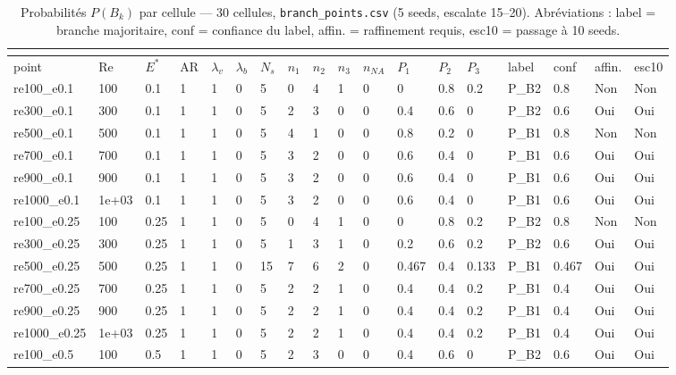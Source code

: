 \documentclass[11pt,a4paper]{article}
\begin{document}
\begin{landscape}
\begingroup\tiny
    \setlength{\tabcolsep}{1.2pt}
    \begin{longtable}{*{18}{l}}
    \caption{Probabilités $P(B_k)$ par cellule --- 30 cellules, \texttt{branch\_points.csv} (5 seeds, escalate 15--20). Abréviations : label = branche majoritaire, conf = confiance du label, affin. = raffinement requis, esc10 = passage à 10 seeds.}\\
    \label{tab:p1_points}\\
    \toprule
    point & Re & $E^*$ & AR & $\lambda_v$ & $\lambda_b$ & $N_s$ & $n_1$ & $n_2$ & $n_3$ & $n_{NA}$ & $P_1$ & $P_2$ & $P_3$ & label & conf & affin. & esc10 \\
    \midrule
    \endhead
    \bottomrule
    \endlastfoot
    re100\_e0.1 & 100 & 0.1 & 1 & 1 & 0 & 5 & 0 & 4 & 1 & 0 & 0 & 0.8 & 0.2 & P\_B2 & 0.8 & Non & Non \\
    re300\_e0.1 & 300 & 0.1 & 1 & 1 & 0 & 5 & 2 & 3 & 0 & 0 & 0.4 & 0.6 & 0 & P\_B2 & 0.6 & Oui & Oui \\
    re500\_e0.1 & 500 & 0.1 & 1 & 1 & 0 & 5 & 4 & 1 & 0 & 0 & 0.8 & 0.2 & 0 & P\_B1 & 0.8 & Non & Non \\
    re700\_e0.1 & 700 & 0.1 & 1 & 1 & 0 & 5 & 3 & 2 & 0 & 0 & 0.6 & 0.4 & 0 & P\_B1 & 0.6 & Oui & Oui \\
    re900\_e0.1 & 900 & 0.1 & 1 & 1 & 0 & 5 & 3 & 2 & 0 & 0 & 0.6 & 0.4 & 0 & P\_B1 & 0.6 & Oui & Oui \\
    re1000\_e0.1 & 1e+03 & 0.1 & 1 & 1 & 0 & 5 & 3 & 2 & 0 & 0 & 0.6 & 0.4 & 0 & P\_B1 & 0.6 & Oui & Oui \\
    re100\_e0.25 & 100 & 0.25 & 1 & 1 & 0 & 5 & 0 & 4 & 1 & 0 & 0 & 0.8 & 0.2 & P\_B2 & 0.8 & Non & Non \\
    re300\_e0.25 & 300 & 0.25 & 1 & 1 & 0 & 5 & 1 & 3 & 1 & 0 & 0.2 & 0.6 & 0.2 & P\_B2 & 0.6 & Oui & Oui \\
    re500\_e0.25 & 500 & 0.25 & 1 & 1 & 0 & 15 & 7 & 6 & 2 & 0 & 0.467 & 0.4 & 0.133 & P\_B1 & 0.467 & Oui & Oui \\
    re700\_e0.25 & 700 & 0.25 & 1 & 1 & 0 & 5 & 2 & 2 & 1 & 0 & 0.4 & 0.4 & 0.2 & P\_B1 & 0.4 & Oui & Oui \\
    re900\_e0.25 & 900 & 0.25 & 1 & 1 & 0 & 5 & 2 & 2 & 1 & 0 & 0.4 & 0.4 & 0.2 & P\_B1 & 0.4 & Oui & Oui \\
    re1000\_e0.25 & 1e+03 & 0.25 & 1 & 1 & 0 & 5 & 2 & 2 & 1 & 0 & 0.4 & 0.4 & 0.2 & P\_B1 & 0.4 & Oui & Oui \\
    re100\_e0.5 & 100 & 0.5 & 1 & 1 & 0 & 5 & 2 & 3 & 0 & 0 & 0.4 & 0.6 & 0 & P\_B2 & 0.6 & Oui & Oui \\

\end{longtable}
\end{landscape}
\end{document}
